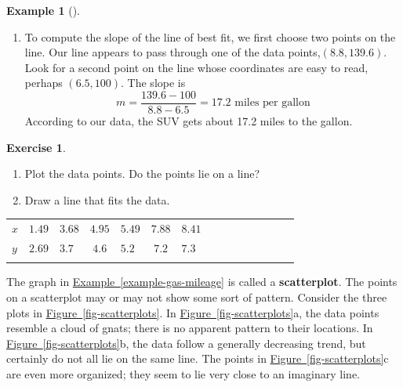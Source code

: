 \documentclass[10pt,]{book}
\newcommand{\terminology}[1]{\textbf{#1}}
\theoremstyle{plain}
\theoremstyle{definition}
\theoremstyle{definition}
\newtheorem{example}[theorem]{Example}
\theoremstyle{definition}
\theoremstyle{definition}
\newtheorem{exercise}[theorem]{Exercise}
\numberwithin{equation}{part}
\newcommand{\hrulethin}  {\noalign{\hrule height 0.04em}}
\newcommand{\hrulethick} {\noalign{\hrule height 0.11em}}
\begin{document}
\begin{example}[]
\begin{enumerate}[label=*\alph**]
\item\hypertarget{li-1298}{}To compute the slope of the line of best fit, we first choose two points on the line. Our line appears to pass through one of the data points,\((8.8, 139.6)\). Look for a second point on the line whose coordinates are easy to read, perhaps \((6.5,100)\). The slope is%
\begin{equation*}
m = \frac{139.6 - 100}{8.8 - 6.5}= 17.2\text{ miles per gallon}
\end{equation*}
According to our data, the SUV gets about 17.2 miles to the gallon.%
\end{enumerate}
%
\end{example}
\begin{exercise}\label{exercise-scatterplot}
\leavevmode%
\begin{enumerate}[label=*\alph**]
\item\hypertarget{li-1299}{}Plot the data points. Do the points lie on a line?%
\item\hypertarget{li-1300}{}Draw a line that fits the data.%
\end{enumerate}
 \begin{table}
\centering
\begin{tabular}{AcAcAcAcAcAcAcA}\hrulethick
\(x\)&\(1.49\)&\(3.68\)&\(4.95\)&\(5.49\)&\(7.88\)&\(8.41\)\tabularnewline\hrulethin
\(y\)&\(2.69\)&\(3.7\)&\(4.6\)&\(5.2\)&\(7.2\)&\(7.3\)\tabularnewline\hrulethin
\end{tabular}
\end{table}
%
\end{exercise}
The graph in \hyperref[example-gas-mileage]{Example~\ref{example-gas-mileage}} is called a \terminology{scatterplot}. The points on a scatterplot may or may not show some sort of pattern. Consider the three plots in \hyperref[fig-scatterplots]{Figure~\ref{fig-scatterplots}}. In \hyperref[fig-scatterplots]{Figure~\ref{fig-scatterplots}}a, the data points resemble a cloud of gnats; there is no apparent pattern to their locations. In \hyperref[fig-scatterplots]{Figure~\ref{fig-scatterplots}}b, the data follow a generally decreasing trend, but certainly do not all lie on the same line. The points in \hyperref[fig-scatterplots]{Figure~\ref{fig-scatterplots}}c are even more organized; they seem to lie very close to an imaginary line.%
\end{document}
